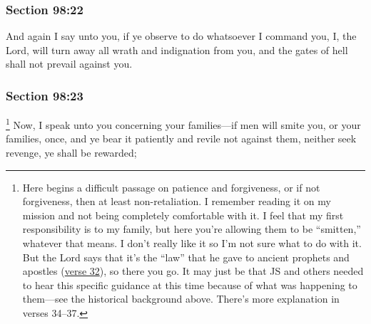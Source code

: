 	\subsubsection{Section 98:22} %
		\label{DC98-22}

		And again I say unto you, if ye observe to do whatsoever I command you, I, the Lord, will turn away all wrath and indignation from you, and the gates of hell shall not prevail against you.


	\subsubsection{Section 98:23} %
		\label{DC98-23}

			\footnote{%
				Here begins a difficult passage on patience and forgiveness, or if not forgiveness, then at least non-retaliation. I remember reading it on my mission and not being completely comfortable with it. I feel that my first responsibility is to my family, but here you're allowing them to be ``smitten,'' whatever that means. I don't really like it so I'm not sure what to do with it. But the Lord says that it's the ``law'' that he gave to ancient prophets and apostles (\hyperref[DC98-32]{verse 32}), so there you go. It may just be that JS and others needed to hear this specific guidance at this time because of what was happening to them---see the historical background above. There's more explanation in verses 34--37.
				}%
		Now, I speak unto you concerning your families---if men will smite you, or your families, once, and ye bear it patiently and revile not against them, neither seek revenge, ye shall be rewarded;


